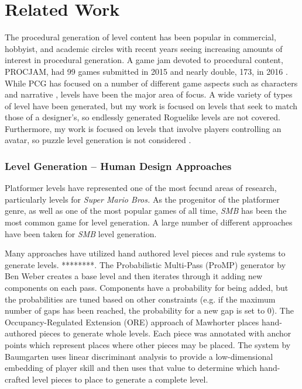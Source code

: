\documentclass[12pt]{report}
\begin{document}
\section*{Related Work}

The procedural generation of level content has been popular in commercial, hobbyist, and academic circles with recent years seeing increasing amounts of interest in procedural generation.   A game jam devoted to procedural content, PROCJAM, had 99 games submitted in 2015 and nearly double, 173, in 2016 \cite{PROCJAM2015,PROCJAM2016}.  While PCG has focused on a number of different game aspects such as characters \cite{SOMETHING} and narrative \cite{SOMETHING}, levels have been the major area of focus.    A wide variety of types of level have been generated, but my work is focused on levels that seek to match those of a designer's, so endlessly generated Roguelike levels \cite{rogue,adom,nethack} are not covered.  Furthermore, my work is focused on levels that involve players controlling an avatar, so puzzle level generation is not considered \cite{refraction,ropossum,angrybirds}.

\subsubsection*{Level Generation -- Human Design Approaches}
Platformer levels have represented one of the most fecund areas of research, particularly levels for \textit{Super Mario Bros.}  As the progenitor of the platformer genre, as well as one of the most popular games of all time, \textit{SMB} has been the most common game for level generation.  A large number of different approaches have been taken for \textit{SMB} level generation.

Many approaches have utilized hand authored level pieces and rule systems to generate levels. ****\cite{KATES Procedural Level Design for Platform Games}****. The Probabilistic Multi-Pass (ProMP) generator by Ben Weber \cite{mario2010} creates a base level and then iterates through it adding new components on each pass.  Components have a probability for being added, but the probabilities are tuned based on other constraints (e.g. if the maximum number of gaps has been reached, the probability for a new gap is set to 0).  The Occupancy-Regulated Extension (ORE) approach of Mawhorter \cite{mawhorterORE} places hand-authored pieces to generate whole levels.  Each piece was annotated with anchor points which represent places where other pieces may be placed.   The system by Baumgarten \cite{mario2010} uses linear discriminant analysis to provide a low-dimensional embedding of player skill and then uses that value to determine which hand-crafted level pieces to place to generate a complete level. 
\end{document}
